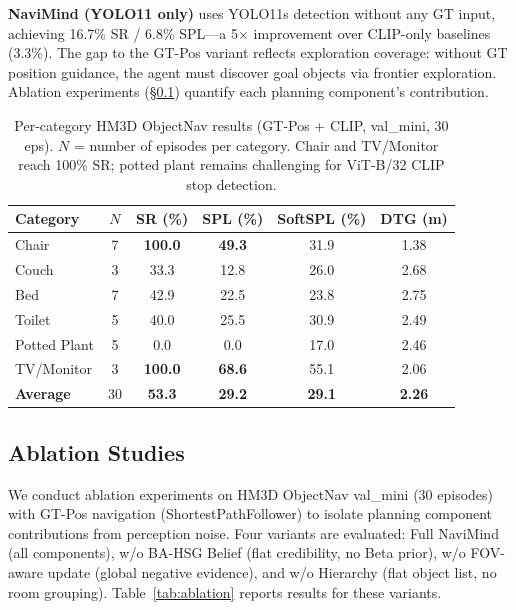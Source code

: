 \documentclass[conference]{IEEEtran}
\begin{document}
\textbf{NaviMind (YOLO11 only)} uses YOLO11s detection without any GT input, achieving 16.7\% SR / 6.8\% SPL---a 5$\times$ improvement over CLIP-only baselines (3.3\%).
The gap to the GT-Pos variant reflects exploration coverage: without GT position guidance, the agent must discover goal objects via frontier exploration.
Ablation experiments (\S\ref{sec:ablation}) quantify each planning component's contribution.

\begin{table}[t]
\centering
\caption{Per-category HM3D ObjectNav results (GT-Pos + CLIP, val\_mini, 30 eps).
$N$ = number of episodes per category.
Chair and TV/Monitor reach 100\% SR; potted plant remains challenging for ViT-B/32 CLIP stop detection.}
\label{tab:hm3d_per_category}
\footnotesize
\begin{tabular}{@{}lccccc@{}}
\toprule
Category & $N$ & SR (\%) & SPL (\%) & SoftSPL (\%) & DTG (m) \\
\midrule
Chair        & 7 & \textbf{100.0} & \textbf{49.3} & 31.9 & 1.38 \\
Couch        & 3 &  33.3 & 12.8 & 26.0 & 2.68 \\
Bed          & 7 &  42.9 & 22.5 & 23.8 & 2.75 \\
Toilet       & 5 &  40.0 & 25.5 & 30.9 & 2.49 \\
Potted Plant & 5 &   0.0 &  0.0 & 17.0 & 2.46 \\
TV/Monitor   & 3 & \textbf{100.0} & \textbf{68.6} & 55.1 & 2.06 \\
\midrule
\textbf{Average} & 30 & \textbf{53.3} & \textbf{29.2} & \textbf{29.1} & \textbf{2.26} \\
\bottomrule
\end{tabular}
\vspace{-2mm}
\end{table}

\subsection{Ablation Studies}
\label{sec:ablation}

We conduct ablation experiments on HM3D ObjectNav val\_mini (30 episodes) with GT-Pos navigation (ShortestPathFollower) to isolate planning component contributions from perception noise.
Four variants are evaluated: Full NaviMind (all components), w/o BA-HSG Belief (flat credibility, no Beta prior), w/o FOV-aware update (global negative evidence), and w/o Hierarchy (flat object list, no room grouping).
Table~\ref{tab:ablation} reports results for these variants.
\end{document}
